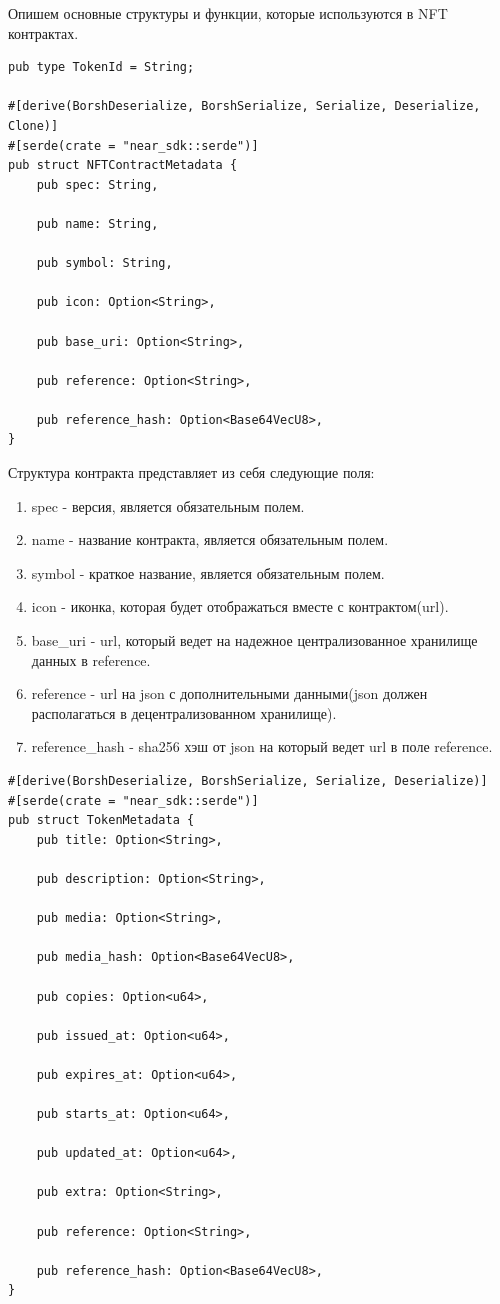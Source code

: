 Опишем основные структуры и функции\cite{corestandard}, которые используются в NFT контрактах.

\begin{verbatim}
pub type TokenId = String;

#[derive(BorshDeserialize, BorshSerialize, Serialize, Deserialize, Clone)]
#[serde(crate = "near_sdk::serde")]
pub struct NFTContractMetadata {
    pub spec: String,

    pub name: String,

    pub symbol: String,

    pub icon: Option<String>,

    pub base_uri: Option<String>,

    pub reference: Option<String>,

    pub reference_hash: Option<Base64VecU8>,
}
\end{verbatim}

Структура контракта представляет из себя следующие поля:
\begin{enumerate}
\item spec - версия, является обязательным полем.
\item name - название контракта, является обязательным полем.
\item symbol - краткое название, является обязательным полем.
\item icon - иконка, которая будет отображаться вместе с контрактом(url).
\item base\_uri - url, который ведет на надежное централизованное хранилище данных в reference.
\item reference - url на json с дополнительными данными(json должен располагаться в децентрализованном хранилище).
\item reference\_hash - sha256 хэш от json на который ведет url в поле reference.
\end{enumerate}

\begin{verbatim}
#[derive(BorshDeserialize, BorshSerialize, Serialize, Deserialize)]
#[serde(crate = "near_sdk::serde")]
pub struct TokenMetadata {
    pub title: Option<String>,

    pub description: Option<String>,

    pub media: Option<String>,

    pub media_hash: Option<Base64VecU8>,

    pub copies: Option<u64>,

    pub issued_at: Option<u64>,

    pub expires_at: Option<u64>,

    pub starts_at: Option<u64>,

    pub updated_at: Option<u64>,

    pub extra: Option<String>,

    pub reference: Option<String>,

    pub reference_hash: Option<Base64VecU8>,
}
\end{verbatim}

